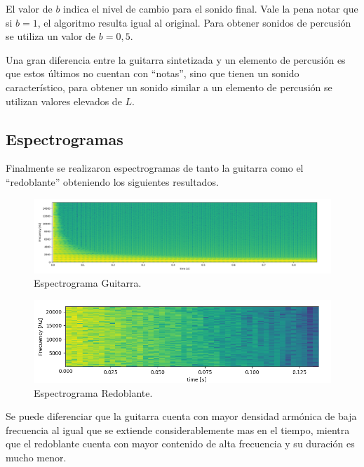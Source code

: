 El valor de $b$ indica el nivel de cambio para el sonido final. Vale la pena notar que si $b=1$, el algoritmo resulta igual al original. Para obtener sonidos de percusión se utiliza un valor de $b=0,5$.

Una gran diferencia entre la guitarra sintetizada y un elemento de percusión es que estos últimos no cuentan con ``notas'', sino que tienen un sonido característico, para obtener un sonido similar a un elemento de percusión se utilizan valores elevados de $L$.

\subsection{Espectrogramas}
Finalmente se realizaron espectrogramas de tanto la guitarra como el ``redoblante'' obteniendo los siguientes resultados.
\begin{figure}[H]
	\centering
	\includegraphics[width=1\textwidth]{ImagenesEjercicio4/espectroGuitar.PNG}
	\caption{Espectrograma Guitarra.}
	\label{fig:especGuitar}
\end{figure}
\begin{figure}[H]
	\centering
	\includegraphics[width=1\textwidth]{ImagenesEjercicio4/espectroDrum.PNG}
	\caption{Espectrograma Redoblante.}
	\label{fig:especdrum}
\end{figure}

Se puede diferenciar que la guitarra cuenta con mayor densidad armónica de baja frecuencia al igual que se extiende considerablemente mas en el tiempo, mientra que el redoblante cuenta con mayor contenido de alta frecuencia y su duración es mucho menor.
